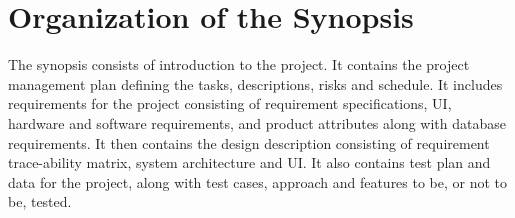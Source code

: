 \section{Organization of the Synopsis}
The synopsis consists of introduction to the project. It contains the project management plan defining the tasks, descriptions, risks and schedule. It includes requirements for the project consisting of requirement specifications, UI, hardware and software requirements, and product attributes along with database requirements. It then contains the design description consisting of requirement trace-ability matrix, system architecture and UI. It also contains test plan and data for the project, along with test cases, approach and features to be, or not to be, tested.
